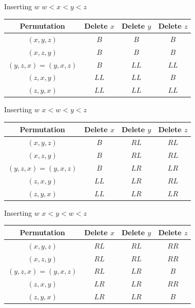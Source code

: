 \documentclass{beamer}
\begin{document}
\begin{frame}{Inserting $w$}
    $w < x < y < z$
    \begin{center}
        \begin{tabular}{||c c c c||} 
            \hline
            Permutation& Delete $x$& Delete $y$ & Delete $z$ \\ [0.5ex] 
            \hline\hline
            $(x,y,z)$ & $B$ & $B$ & $B$ \\ 
            \hline
            $(x,z,y)$ & $B$ & $B$ & $B$ \\ 
            \hline
            $(y,z,x) = (y,x,z)$ & $B$ & $LL$ & $LL$\\ 
            \hline
            $(z,x,y)$ & $LL$ & $LL$ & $B$\\ 
            \hline
            $(z,y,x)$ & $LL$ & $LL$ & $LL$ \\ 
            \hline
        \end{tabular}
    \end{center}
\end{frame}

\begin{frame}{Inserting $w$}
    $x < w < y < z$
    \begin{center}
        \begin{tabular}{||c c c c||} 
            \hline
            Permutation& Delete $x$& Delete $y$ & Delete $z$ \\ [0.5ex] 
            \hline\hline
            $(x,y,z)$ & $B$ & $RL$ & $RL$ \\ 
            \hline
            $(x,z,y)$ & $B$ & $RL$ & $RL$ \\ 
            \hline
            $(y,z,x) = (y,x,z)$ & $B$ & $LR$ & $LR$\\ 
            \hline
            $(z,x,y)$ & $LL$ & $LR$ & $RL$\\ 
            \hline
            $(z,y,x)$ & $LL$ & $LR$ & $LR$ \\ 
            \hline
        \end{tabular}
    \end{center}
\end{frame}

\begin{frame}{Inserting $w$}
    $x < y < w < z$
    \begin{center}
        \begin{tabular}{||c c c c||} 
            \hline
            Permutation& Delete $x$& Delete $y$ & Delete $z$ \\ [0.5ex] 
            \hline\hline
            $(x,y,z)$ & $RL$ & $RL$ & $RR$ \\ 
            \hline
            $(x,z,y)$ & $RL$ & $RL$ & $RR$ \\  
            \hline
            $(y,z,x) = (y,x,z)$ & $RL$ & $LR$ & $B$\\ 
            \hline
            $(z,x,y)$ & $LR$ & $LR$ & $RR$\\ 
            \hline
            $(z,y,x)$ & $LR$ & $LR$ & $B$ \\ 
            \hline
        \end{tabular}
    \end{center}
\end{frame}
\end{document}
